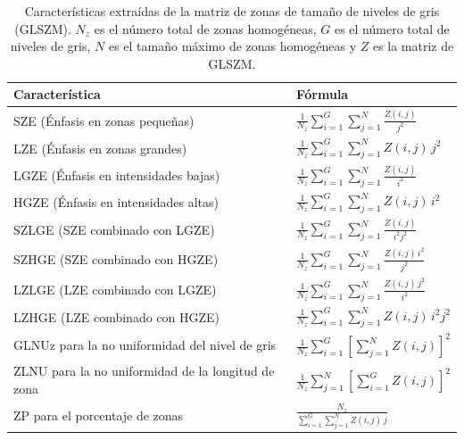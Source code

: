 \begin{table}[!htbp]
\centering
\renewcommand{\arraystretch}{3.0}
\setlength{\tabcolsep}{12pt}
\caption{Características extraídas de la matriz de zonas de tamaño de niveles de gris (GLSZM). $N_z$ es el número total de zonas homogéneas, $G$ es el número total de niveles de gris, $N$ es el tamaño máximo de zonas homogéneas y $Z$ es la matriz de GLSZM.}
\label{tab:GLSZMZ}
\begin{tabular*}{\textwidth}{@{\extracolsep{\fill}} l l}
\toprule
\textbf{Característica} & \textbf{Fórmula} \\
\midrule
SZE (Énfasis en zonas pequeñas) & 
$\displaystyle \frac{1}{N_z} \sum_{i=1}^{G} \sum_{j=1}^{N} \frac{Z(i,j)}{j^2}$ \\

LZE (Énfasis en zonas grandes) & 
$\displaystyle \frac{1}{N_z} \sum_{i=1}^{G} \sum_{j=1}^{N} Z(i,j) \, j^2$ \\

LGZE (Énfasis en intensidades bajas) & 
$\displaystyle \frac{1}{N_z} \sum_{i=1}^{G} \sum_{j=1}^{N} \frac{Z(i,j)}{i^2}$ \\

HGZE (Énfasis en intensidades altas) & 
$\displaystyle \frac{1}{N_z} \sum_{i=1}^{G} \sum_{j=1}^{N} Z(i,j) \, i^2$ \\

SZLGE (SZE combinado con LGZE) & 
$\displaystyle \frac{1}{N_z} \sum_{i=1}^{G} \sum_{j=1}^{N} \frac{Z(i,j)}{i^2 j^2}$ \\

SZHGE (SZE combinado con HGZE) & 
$\displaystyle \frac{1}{N_z} \sum_{i=1}^{G} \sum_{j=1}^{N} \frac{Z(i,j) \, i^2}{j^2}$ \\

LZLGE (LZE combinado con LGZE) & 
$\displaystyle \frac{1}{N_z} \sum_{i=1}^{G} \sum_{j=1}^{N} \frac{Z(i,j) \, j^2}{i^2}$ \\

LZHGE (LZE combinado con HGZE) & 
$\displaystyle \frac{1}{N_z} \sum_{i=1}^{G} \sum_{j=1}^{N} Z(i,j) \, i^2 j^2$ \\

GLNUz  para la no uniformidad del nivel de gris & 
$\displaystyle \frac{1}{N_z} \sum_{i=1}^{G} \left[\sum_{j=1}^{N} Z(i,j)\right]^2$ \\

ZLNU para la no uniformidad de la longitud de zona & 
$\displaystyle \frac{1}{N_z} \sum_{j=1}^{N} \left[\sum_{i=1}^{G} Z(i,j)\right]^2$ \\

ZP para el porcentaje de zonas & 
$\displaystyle \frac{N_z}{\sum_{i=1}^{G} \sum_{j=1}^{N} Z(i,j) \, j}$ \\
\bottomrule
\end{tabular*}
\end{table}


